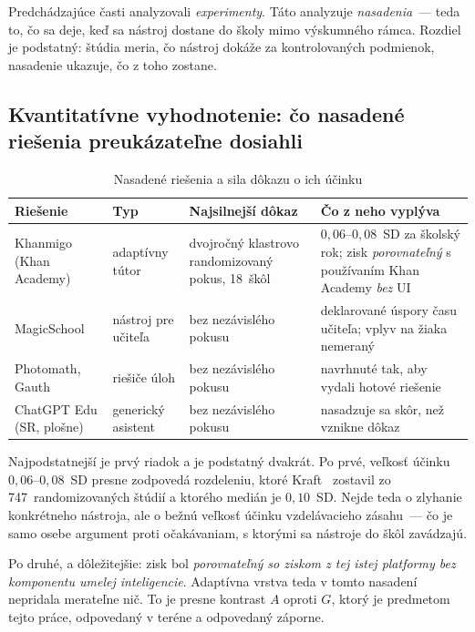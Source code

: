 Predchádzajúce časti analyzovali \emph{experimenty}. Táto analyzuje \emph{nasadenia}~--- teda to, čo sa deje, keď sa nástroj dostane do školy mimo výskumného rámca. Rozdiel je podstatný: štúdia meria, čo nástroj dokáže za kontrolovaných podmienok, nasadenie ukazuje, čo z toho zostane.

\subsection{Kvantitatívne vyhodnotenie: čo nasadené riešenia preukázateľne dosiahli}

\begin{table}[H]
\centering
\caption{Nasadené riešenia a sila dôkazu o ich účinku}
\label{tab:nasadenia}
\scriptsize
\begin{tabularx}{\textwidth}{@{}l l l X@{}}
\toprule
\textbf{Riešenie} & \textbf{Typ} & \textbf{Najsilnejší dôkaz} & \textbf{Čo z neho vyplýva} \\
\midrule
Khanmigo (Khan Academy) & adaptívny tútor & dvojročný klastrovo randomizovaný pokus, 18~škôl & $0{,}06$--$0{,}08$~SD za školský rok; zisk \emph{porovnateľný} s používaním Khan Academy \emph{bez} UI \\
MagicSchool & nástroj pre učiteľa & bez nezávislého pokusu & deklarované úspory času učiteľa; vplyv na žiaka nemeraný \\
Photomath, Gauth & riešiče úloh & bez nezávislého pokusu & navrhnuté tak, aby vydali hotové riešenie \\
ChatGPT Edu (SR, plošne) & generický asistent & bez nezávislého pokusu & nasadzuje sa skôr, než vznikne dôkaz \\
\bottomrule
\end{tabularx}
\end{table}

Najpodstatnejší je prvý riadok a je podstatný dvakrát. Po prvé, veľkosť účinku $0{,}06$--$0{,}08$~SD presne zodpovedá rozdeleniu, ktoré Kraft~\cite{kraft2020effectsizes} zostavil zo 747~randomizovaných štúdií a ktorého medián je $0{,}10$~SD. Nejde teda o zlyhanie konkrétneho nástroja, ale o bežnú veľkosť účinku vzdelávacieho zásahu~--- čo je samo osebe argument proti očakávaniam, s ktorými sa nástroje do škôl zavádzajú.

Po druhé, a dôležitejšie: zisk bol \emph{porovnateľný so ziskom z tej istej platformy bez komponentu umelej inteligencie}. Adaptívna vrstva teda v tomto nasadení nepridala merateľne nič. To je presne kontrast $A$ oproti $G$, ktorý je predmetom tejto práce, odpovedaný v teréne a odpovedaný záporne.


